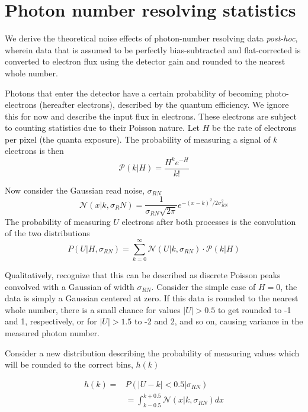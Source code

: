 \section{Photon number resolving statistics}\label{sec:pnr_derivation}

We derive the theoretical noise effects of photon-number resolving data \textit{post-hoc}, wherein data that is assumed to be perfectly bias-subtracted and flat-corrected is converted to electron flux using the detector gain and rounded to the nearest whole number.

Photons that enter the detector have a certain probability of becoming photo-electrons (hereafter electrons), described by the quantum efficiency. We ignore this for now and describe the input flux in electrons. These electrons are subject to counting statistics due to their Poisson nature. Let $H$ be the rate of electrons per pixel (the quanta exposure). The probability of measuring a signal of $k$ electrons is then
\begin{equation}
    \mathcal{P}\left(k | H\right) = \frac{H^k e^{-H}}{k!}
\end{equation}

Now consider the Gaussian read noise, $\sigma_{RN}$
\begin{equation}
    \mathcal{N}\left(x | k, \sigma_RN\right) = \frac{1}{\sigma_{RN}\sqrt{2\pi}}e^{-(x - k)^2 / 2\sigma_{RN}^2}
\end{equation}
The probability of measuring $U$ electrons after both processes is the convolution of the two distributions
\begin{equation}
    P(U | H, \sigma_{RN}) = \sum_{k=0}^\infty{\mathcal{N}\left(U | k, \sigma_{RN}\right)\cdot \mathcal{P}\left(k|H\right)}
\end{equation}

Qualitatively, recognize that this can be described as discrete Poisson peaks convolved with a Gaussian of width $\sigma_{RN}$. Consider the simple case of $H=0$, the data is simply a Gaussian centered at zero. If this data is rounded to the nearest whole number, there is a small chance for values $|U|>0.5$  to get rounded to -1 and 1, respectively, or for $|U| > 1.5$ to -2 and 2, and so on, causing variance in the measured photon number. 

Consider a new distribution describing the probability of measuring values which will be rounded to the correct bins, $h(k)$

\begin{align}
    h(k) = &P\left(|U - k| < 0.5 | \sigma_{RN}\right) \\
    &= \int_{k - 0.5}^{k + 0.5}{\mathcal{N}(x | k, \sigma_{RN}) dx}
\end{align}

